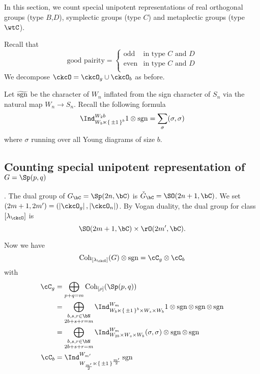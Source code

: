 \documentclass[12pt,a4paper]{amsart}
\def\abs#1{\left|{#1}\right|}
\newcommand{\sgn}{\operatorname{sgn}}
\numberwithin{equation}{section}
\theoremstyle{remark}
\def\ckGc{\check{G}_{\bC}}
\def\lamck{\lambda_\ckcO}
\def\Cint#1{\Coh_{[#1]}}
\def\Gc{G_\bC}
\def\Coh{\mathrm{Coh}}
\begin{document}
\subsection{}
In this section, we count special unipotent representations of real orthogonal
groups (type $B$,$D$), symplectic groups (type $C$) and metaplectic groups (type
$\wtC$). 

Recall that 
\[
  \text{good pairity} = 
\begin{cases}
 \text{odd} & \text{in type $C$ and $D$}\\ 
 \text{even} & \text{in type $C$ and $D$}\\ 
\end{cases}  
\]
We decompose $\ckcO  = \ckcO_g\cup \ckcO_b$ as before. 

Let $\tsgn$ be the character of $W_n$ inflated from the sign character of $S_n$ via the 
natural map $W_n \rightarrow S_n$.  
Recall the following formula
\[
  \Ind_{W_b\ltimes \set{\pm 1}^b}^{W_2b} 1 \otimes \sgn = \sum_{\sigma} (\sigma,\sigma) 
\]
where $\sigma$ running over all Young diagrams of size $b$. 



\subsection{Counting special unipotent representation of $G=\Sp(p,q)$}. 
The dual group of $\Gc = \Sp(2n,\bC)$ is $\ckGc = \SO(2n+1,\bC)$. 
We set $(2m+1,2m') = (\abs{\ckcO_g},\abs{\ckcO_n})$.
By Vogan duality, the dual group for class $[\lamck]$ is 
\[
 \SO(2m+1,\bC)\times \rO(2m',\bC).   
\]


Now we have 
\[
  \Cint{\lamck}(G) \otimes \sgn  = \cC_g\otimes \cC_b 
\]
with 
\[
  \begin{split}
 \cC_g &  = \bigoplus_{p+q=m} \Cint{\rho}(\Sp(p,q)) \\ 
 &=\bigoplus_{\substack{b,s,r\in\bN\\2b+s+r=m}}
 \Ind_{W_b\ltimes \set{\pm 1}^b \times W_s\times W_b}^{W_{m}} 
 1\otimes \sgn \otimes \sgn \otimes \sgn \\
& =\bigoplus_{\substack{b,s,r\in\bN\\2b+s+r=m}}
 \Ind_{W_{2b}\times W_s\times W_b}^{W_{m}} 
 (\sigma,\sigma)\otimes \sgn \otimes \sgn \\
 \cC_b &  = \Ind_{W_{\frac{m'}{2}}\ltimes \set{\pm 1}^{\frac{m'}{2}}}^{W_{m'}} \sgn 
 \\
  \end{split}
\]
\end{document}
